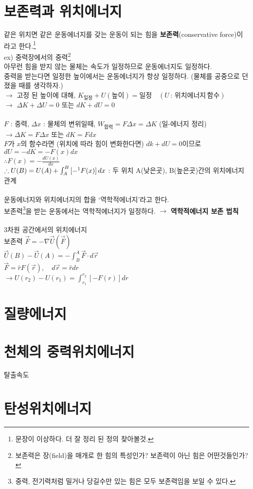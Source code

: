\documentclass[10pt,a4paper]{report}
\begin{document}
	\section{보존력과 위치에너지}
	
	같은 위치면 같은 운동에너지를 갖는 운동이 되는 힘을 \textbf{보존력}(conservative force)이라고 한다.\footnote{문장이 이상하다. 더 잘 정리 된 정의 찾아볼것.}\\
	ex) 중력장에서의 중력\footnote{보존력은 장(field)을 매개로 한 힘의 특성인가? 보존력이 아닌 힘은 어떤것들인가?}\\
	아무런 힘을 받지 않는 물체는 속도가 일정하므로 운동에너지도 일정하다.\\
	중력을 받는다면 일정한 높이에서는 운동에너지가 항상 일정하다. (물체를 공중으로 던졌을 때를 생각하자.)\\
	$\rightarrow$ 고정 된 높이에 대해, $K_{일정} + U(높이) = 일정 \quad(U\,:\,위치에너지\,함수)$\\
	$\rightarrow$ $\Delta K + \Delta U = 0$ 또는 $dK + dU = 0$\\
	\\
	$F$ : 중력, $\Delta x$ : 물체의 변위일때, $W_{합력} = F \Delta x = \Delta K$ (일-에너지 정리)\\
	$\rightarrow \Delta K = F \Delta x$ 또는 $dK = F dx$\\
	$F$가 $x$의 함수라면 (위치에 따라 힘이 변화한다면) $dk + dU = 0$이므로 $dU = -dK = -F(x)dx$\\
	$\therefore F(x) = - \frac{dU(x)}{dx}$\\
	$\therefore U(B) = U(A) + \int_{A}^{B} \left[ - \footnotemark F(x) \right] dx$ : 두 위치 A(낮은곳), B(높은곳)간의 위치에너지 관계
	\\
	\\
	운동에너지와 위치에너지의 합을 `역학적에너지'라고 한다.\\
	보존력\footnote{중력, 전기력처럼 밀거나 당길수만 있는 힘은 모두 보존력임을 보일 수 있다.}을 받는 운동에서는 역학적에너지가 일정하다. $\rightarrow$ \textbf{역학적에너지 보존 법칙}\\
	\\
	3차원 공간에서의 위치에너지\\
	보존력 $\vec{F} = - \nabla \vec{U}(\vec{F})$\\
	$\vec{U}(B) - \vec{U}(A) = - \int_{B}^{A} \vec{F} \cdot d \vec{r}$\\
	$\vec{F} = \hat{r} F(\vec{r}), \quad d \vec{r} = \hat{r} dr$\\
	$\rightarrow U(r_2) - U(r_1) = \int_{r_1}^{r_2} \left[ -F(r) \right] dr$
	
	\section{질량에너지}
	
	\section{천체의 중력위치에너지}
	
	탈출속도
	
	\section{탄성위치에너지}
	
\end{document}
